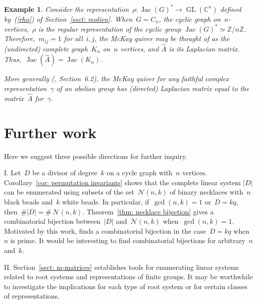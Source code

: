 \documentclass{amsart}
\newtheorem{Example}[thm]{Example}
\newenvironment{example}
  {\begin{Example}\rm}{\end{Example}}
\DeclareMathOperator{\Jac}{Jac}
\DeclareMathOperator{\GL}{GL}
\newcommand{\Z}{\mathbb{Z}}
\newcommand{\C}{\mathbb{C}}
\newcommand{\wA}{\widehat{A}}
\newcommand{\neck}{\mathcal{N}}
\begin{document}
\begin{example} Consider the representation~$\rho\colon\Jac(G)^*\to\GL(\C^n)$
  defined by~(\ref{rho}) of Section~\ref{sect: molien}.  When~$G=C_n$, the
  cyclic graph on~$n$-vertices,~$\rho$ is the regular representation of the
  cyclic group $\Jac(G)^*\simeq\Z/n\Z$.  Therefore,~$m_{ij}=1$ for all~$i,j$,
  the McKay quiver may be thought of as the (undirected) complete graph~$K_n$
  on~$n$ vertices, and $\wA$ is its Laplacian matrix.
  Thus,~$\Jac(\wA)=\Jac(K_n)$.

  More generally (\cite{BKR}, Section~6.2), the McKay quiver for any faithful complex
  representation~$\gamma$ of an abelian group has (directed) Laplacian matrix equal to the
  matrix~$\wA$ for~$\gamma$.
\end{example}

\section{Further work}\label{sect: further}
Here we suggest three possible directions for further inquiry.
\medskip

\noindent I. Let~$D$ be a divisor of degree~$k$ on a cycle graph with~$n$ vertices.
Corollary~\ref{cor: permutation invariants} shows that the complete linear
system $|D|$ can be enumerated using subsets of the set~$\neck(n,k)$ of binary
necklaces with~$n$ black beads and~$k$ white beads.  In particular,
if~$\gcd(n,k)=1$ or~$D=kq$, then~$\#|D|=\#\,\neck(n,k)$.  Theorem~\ref{thm:
necklace bijection} gives a combinatorial bijection between~$|D|$
and~$\neck(n,k)$ when~$\gcd(n,k)=1$. Motivated by this work, \cite{Oh} finds a
combinatorial bijection in the case~$D=kq$ when~$n$ is prime.  It would be
interesting to find combinatorial bijections for arbitrary~$n$ and~$k$.
\medskip

\noindent II. Section~\ref{sect: m-matrices} establishes tools for enumerating
linear systems related to root systems and representations of finite groups.
It may be worthwhile to investigate the implications for each type of root
system or for certain classes of representations.
\medskip
\end{document}
